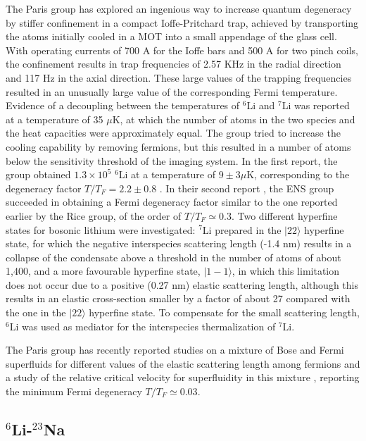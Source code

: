 \documentclass[pra,letterpaper,twocolumn,showpacs,superscriptaddress]{revtex4}
\begin{document}
The Paris group has explored an ingenious way to increase quantum degeneracy by stiffer confinement in a compact Ioffe-Pritchard trap, 
achieved by transporting the atoms initially cooled in a MOT into a small appendage of the glass cell. With operating currents of 700 A 
for the Ioffe bars and 500 A for two pinch coils, the confinement results in trap frequencies of 2.57 KHz in the radial direction and 
117 Hz in the axial direction. These large values of the trapping frequencies resulted in an unusually large value of the corresponding Fermi temperature. 
Evidence of a decoupling between the temperatures of ${}^6$Li and ${}^7$Li was reported at a temperature of 35 $\mu$K, at which the number of atoms 
in the two species and the heat capacities were approximately equal. The group tried to increase the cooling capability by removing fermions, but this resulted 
in a number of atoms below the sensitivity threshold of the imaging system. In the first report, the group obtained $1.3 \times 10^5$ ${}^6$Li 
at a temperature of $9\pm 3 \mu$K, corresponding to the degeneracy factor $T/T_F=2.2 \pm 0.8$ \cite{Schreck2001a}. 
In their second report \cite{Schreck2001b}, the ENS group succeeded in obtaining a Fermi degeneracy factor similar to the one 
reported earlier by the Rice group, of the order of $T/T_F \simeq 0.3$. Two different hyperfine states for bosonic lithium were investigated:
${}^7$Li prepared in the $|2 2\rangle$ hyperfine state, for which the negative interspecies scattering length (-1.4 nm) results in  a collapse 
of the condensate above a threshold in the number of atoms of about 1,400, and a more favourable hyperfine state, $|1 -1 \rangle$, in 
which this limitation does not occur due to a positive (0.27 nm) elastic scattering length, although this results in an elastic cross-section 
smaller by a factor of about 27 compared with the one in the $|2 2 \rangle$ hyperfine state. To compensate for the small scattering length, 
${}^6$Li was used as mediator for the interspecies thermalization of ${}^7$Li. 

The Paris group has recently reported studies on a mixture of Bose and Fermi superfluids \cite{Ferrier2014} for different values of the 
elastic scattering length among fermions and a study of the relative critical velocity for superfluidity in this mixture \cite{Delehaye2015}, 
reporting the minimum Fermi degeneracy $T/T_F \simeq 0.03$. 

\subsection{\bf{${}^6$Li-${}^{23}$Na}}
\end{document}
